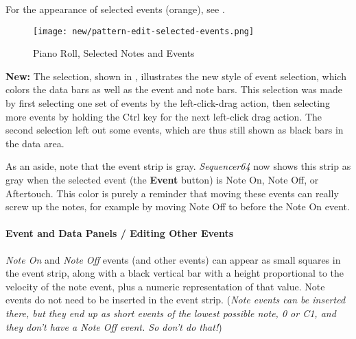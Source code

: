   For the appearance of selected events (orange), see
   .

\begin{figure}[H]
   \centering 
   \texttt{[image: new/pattern-edit-selected-events.png]}
   \caption{Piano Roll, Selected Notes and Events}
   \label{fig:pattern_editor_selected_events}
\end{figure}

   \textbf{New:}
   The selection, shown in
   ,
   illustrates the new style of event selection, which colors the data
   bars as well as the event and note bars.  This selection was made by first
   selecting one set of events by the
   left-click-drag action, then
   selecting more events by holding the Ctrl key for the next left-click drag
   action.  The second selection left out some events, which are thus still
   shown as black bars in the data area.

   As an aside, note that the event strip is gray.  \textsl{Sequencer64}
   now shows this strip as gray when the selected event (the \textbf{Event}
   button) is Note On, Note Off, or Aftertouch.  This color is purely a
   reminder that moving these events can really screw up the notes, for example
   by moving Note Off to before the Note On event.
   
\paragraph{Event and Data Panels / Editing Other Events}
\label{paragraph:seq64_pattern_editor_other_events}


   \textsl{Note On} and \textsl{Note Off} events (and other events) can appear
   as small squares in the event strip, along with a black vertical bar with a
   height proportional to the velocity of the note event, plus a numeric
   representation of that value.
   Note events do not need to be inserted in the event strip.
   (\textsl{Note events can be inserted there, but they end up as short
   events of the lowest possible note, 0 or C1, and they don't have a Note
   Off event.  So don't do that!})


